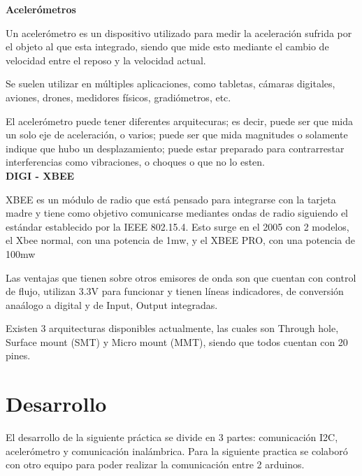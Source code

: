 \documentclass[conference]{IEEEtran}
\begin{document}
\textbf{Acelerómetros}\\
\par Un acelerómetro es un dispositivo utilizado para medir la aceleración sufrida por el objeto al que esta integrado, siendo que mide esto mediante el cambio de velocidad entre el reposo y la velocidad actual.\\
\par Se suelen utilizar en múltiples aplicaciones, como tabletas, cámaras digitales, aviones, drones, medidores físicos, gradiómetros, etc.\\
\par El acelerómetro puede tener diferentes arquitecuras; es decir, puede ser que mida un solo eje de aceleración, o varios; puede ser que mida magnitudes o solamente indique que hubo un desplazamiento; puede estar preparado para contrarrestar interferencias como vibraciones, o choques o que no lo esten.\\

\textbf{DIGI - XBEE}\\
\par XBEE es un módulo de radio que está pensado para integrarse con la tarjeta madre y tiene como objetivo comunicarse mediantes ondas de radio siguiendo el estándar establecido por la IEEE 802.15.4. Esto surge en el 2005 con 2 modelos, el Xbee normal, con una potencia de 1mw, y el XBEE PRO, con una potencia de 100mw\\
\par Las ventajas que tienen sobre otros emisores de onda son que cuentan con control de flujo, utilizan 3.3V para funcionar y tienen líneas indicadores, de conversión anaálogo a digital y de Input, Output integradas.\\
\par Existen 3 arquitecturas disponibles actualmente, las cuales son Through hole, Surface mount (SMT) y Micro mount (MMT), siendo que todos cuentan con 20 pines.\\



\section{Desarrollo}
El desarrollo de la siguiente práctica se divide en 3 partes: comunicación I2C, acelerómetro y comunicación inalámbrica. Para la siguiente practica se colaboró con otro equipo para poder realizar la comunicación entre 2 arduinos.
\end{document}

